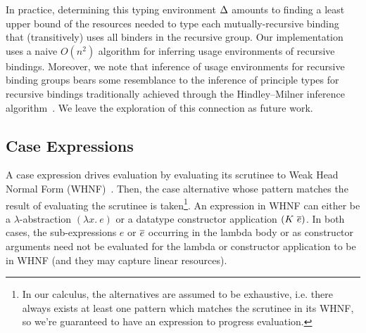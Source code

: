 \documentclass[acmsmall,review,anonymous,screen]{acmart}
\begin{document}
In practice, determining this typing environment $\Delta$ amounts to finding a
least upper bound of the resources needed to type each mutually-recursive
binding that (transitively) uses all binders in the recursive group.
%
Our implementation uses a naive $O(n^2)$ algorithm for inferring usage
environments of recursive bindings.
%
%
Moreover, we note that inference of usage environments for recursive binding
groups bears some resemblance to the inference of principle types for recursive
bindings traditionally achieved through the Hindley–Milner inference
algorithm~\cite{DBLP:conf/popl/DamasM82}. %
We leave the exploration of this connection
as future work.


\subsection{Case Expressions\label{sec:lc-case-exps}}

%
%
%
A case expression drives evaluation by evaluating its scrutinee to Weak Head
Normal Form (WHNF)~\cite{10.5555/1096899}. Then, the case
alternative whose pattern matches the result of evaluating the
scrutinee is taken\footnote{In our calculus, the alternatives are assumed to be
  exhaustive, i.e. there always exists at least one pattern which
  matches the scrutinee in its WHNF, so we're guaranteed to have an
  expression to progress evaluation.}.
An expression in WHNF can either be %
a $\lambda$-abstraction $(\lambda x.~e)$ 
or a datatype constructor application $(K~\overline{e})$.
In both cases, the sub-expressions $e$ or $\overline{e}$ occurring in the lambda body
or as constructor arguments need not be evaluated for the lambda or constructor
application to be in WHNF %
%
(and they may capture linear resources).
\end{document}
